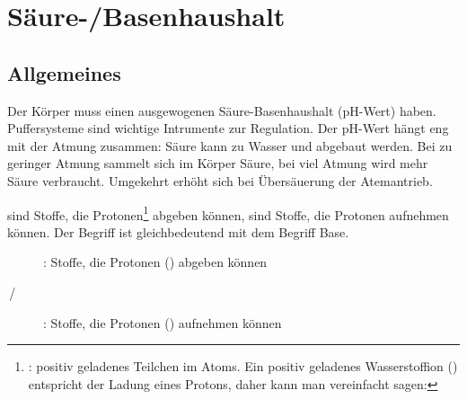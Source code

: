 \section{Säure-/Basenhaushalt}
\label{topic:saeure-basen-haushalt}

\subsection{Allgemeines}

{Der Körper muss einen ausgewogenen Säure-Basenhaushalt
(pH-Wert) haben. Puffersysteme sind wichtige Intrumente zur
Regulation. Der pH-Wert hängt eng mit der Atmung zusammen:
Säure kann zu Wasser und  abgebaut werden. Bei zu
geringer Atmung sammelt sich im Körper Säure, bei
viel Atmung wird mehr Säure verbraucht. Umgekehrt erhöht
sich bei Übersäuerung der Atemantrieb. 

}{}{}{}{}

{%
 sind Stoffe, die Protonen\footnote{:
positiv geladenes Teilchen im Atoms. Ein positiv geladenes
Wasserstoffion () entspricht der Ladung eines
Protons, daher kann man vereinfacht sagen:
} abgeben
können,  sind Stoffe, die Protonen aufnehmen
können. Der
Begriff
 ist gleichbedeutend mit dem Begriff Base. \cite{LoefflerBiochemie7}

\bigskip

\bigskip
}{%
\begin{description}
  \item[]: Stoffe, die
  Protonen () abgeben können
  \item[\,/\,]: Stoffe, die
  Protonen () aufnehmen können
\end{description}
}{}{}{}



